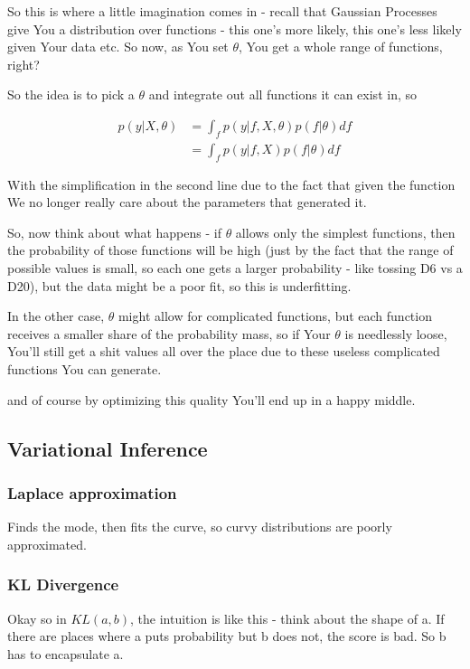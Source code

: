 \documentclass{article}
\begin{document}
		So this is where a little imagination comes in - recall that Gaussian Processes give You a distribution over functions - this one's more likely, this one's less likely given Your data etc. So now, as You set $\theta$, You get a whole range of functions, right?
		
		So the idea is to pick a $\theta$ and integrate out all functions it can exist in, so
		
		\begin{align}
			p(y|X, \theta) &= \int_f p(y|f, X, \theta) p(f|\theta) df\\
			&= \int_f p(y|f, X) p(f|\theta) df
		\end{align}
	
		With the simplification in the second line due to the fact that given the function We no longer really care about the parameters that generated it.
		
		So, now think about what happens - if $\theta$ allows only the simplest functions, then the probability of those functions will be high (just by the fact that the range of possible values is small, so each one gets a larger probability - like tossing D6 vs a D20), but the data might be a poor fit, so this is underfitting.
		
		In the other case, $\theta$ might allow for complicated functions, but each function receives a smaller share of the probability mass, so if Your $\theta$ is needlessly loose, You'll still get a shit values all over the place due to these useless complicated functions You can generate.
		
		and of course by optimizing this quality You'll end up in a happy middle.
		
	\subsection{Variational Inference}
	
		\subsubsection{Laplace approximation}
		
			Finds the mode, then fits the curve, so curvy distributions are poorly approximated.
			
		\subsubsection{KL Divergence}
		
			Okay so in $KL(a, b)$, the intuition is like this - think about the shape of a. If there are places where a puts probability but b does not, the score is bad. So b has to encapsulate a.
			
\end{document}
